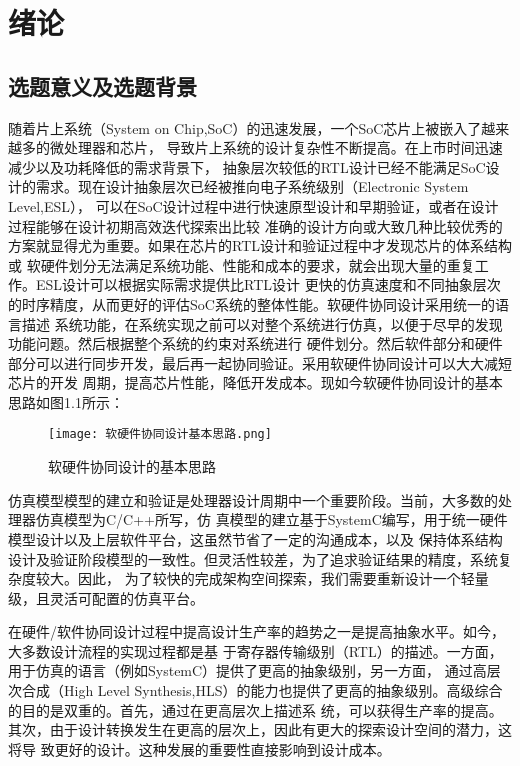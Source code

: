 
\chapter{绪论}

\section{选题意义及选题背景}
随着片上系统（System on Chip,SoC）的迅速发展，一个SoC芯片上被嵌入了越来越多的微处理器和芯片，
导致片上系统的设计复杂性不断提高。在上市时间迅速减少以及功耗降低的需求背景下，
抽象层次较低的RTL设计已经不能满足SoC设计的需求。现在设计抽象层次已经被推向电子系统级别（Electronic System Level,ESL），
可以在SoC设计过程中进行快速原型设计和早期验证\cite{1}，或者在设计过程能够在设计初期高效迭代探索出比较
准确的设计方向或大致几种比较优秀的方案就显得尤为重要。如果在芯片的RTL设计和验证过程中才发现芯片的体系结构或
软硬件划分无法满足系统功能、性能和成本的要求，就会出现大量的重复工作。ESL设计可以根据实际需求提供比RTL设计
更快的仿真速度和不同抽象层次的时序精度，从而更好的评估SoC系统的整体性能。软硬件协同设计采用统一的语言描述
系统功能，在系统实现之前可以对整个系统进行仿真，以便于尽早的发现功能问题。然后根据整个系统的约束对系统进行
硬件划分。然后软件部分和硬件部分可以进行同步开发，最后再一起协同验证。采用软硬件协同设计可以大大减短芯片的开发
周期，提高芯片性能，降低开发成本。现如今软硬件协同设计的基本思路如图1.1所示：
\begin{figure}
    \centering
    \texttt{[image: 软硬件协同设计基本思路.png]}
    \caption{软硬件协同设计的基本思路}
    \label{fig:badge}
\end{figure}

仿真模型模型的建立和验证是处理器设计周期中一个重要阶段。当前，大多数的处理器仿真模型为C/C++所写，仿
真模型的建立基于SystemC\cite{2}编写，用于统一硬件模型设计以及上层软件平台，这虽然节省了一定的沟通成本，以及
保持体系结构设计及验证阶段模型的一致性。但灵活性较差，为了追求验证结果的精度，系统复杂度较大。因此，
为了较快的完成架构空间探索，我们需要重新设计一个轻量级，且灵活可配置的仿真平台。

在硬件/软件协同设计过程\cite{3}中提高设计生产率的趋势之一是提高抽象水平。如今，大多数设计流程的实现过程都是基
于寄存器传输级别（RTL）的描述。一方面，用于仿真的语言（例如SystemC）提供了更高的抽象级别，另一方面，
通过高层次合成（High Level Synthesis,HLS）\cite{4}的能力也提供了更高的抽象级别。高级综合的目的是双重的。首先，通过在更高层次上描述系
统，可以获得生产率的提高。其次，由于设计转换发生在更高的层次上，因此有更大的探索设计空间的潜力，这将导
致更好的设计。这种发展的重要性直接影响到设计成本。

